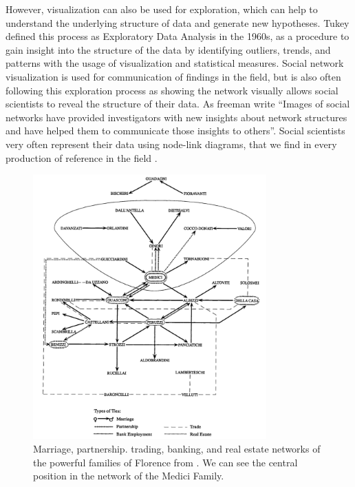 However, visualization can also be used for exploration, which can help to understand the underlying structure of data and generate new hypotheses.
Tukey defined this process as Exploratory Data Analysis in the 1960s\cite{tukeyExploratoryDataAnalysis1977}, as a procedure to gain insight into the structure of the data by identifying outliers, trends, and patterns with the usage of visualization and statistical measures.
Social network visualization is used for communication of findings in the field, but is also often following this exploration process as showing the network visually allows social scientists to reveal the structure of their data.
As freeman write ``Images of social networks have provided investigators with new insights about network structures and have helped them to communicate those insights to others''\cite{freemanVisualizingSocialNetworks2000}.
Social scientists very often represent their data using node-link diagrams, that we find in every production of reference in the field \cite{wassermanSocialNetworkAnalysis1994, tabassumSocialNetworkAnalysis2018, sna, lazegaReseaux}.

\begin{figure}[!ht]
    \centering %
    \includegraphics[width=0.8\textwidth]{static/figures/RelatedWork/padgett-Medicis.png}
    \caption{Marriage, partnership. trading, banking, and real estate networks of the powerful families of Florence from \cite{padgettRobustActionRise1993}. We can see the central position in the network of the Medici Family.}
    \label{fig:padgett-medicis}
\end{figure}

